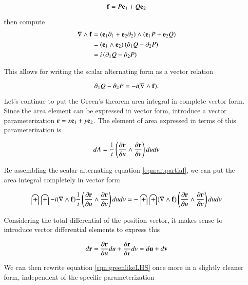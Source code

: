 \documentclass{article}
\newcommand{\grad}[0]{\nabla}
\newcommand{\PD}[2]{\frac{\partial {#2}}{\partial {#1}}}
\begin{document}
\begin{equation*}
\mathbf{f} = P \mathbf{e}_1 + Q \mathbf{e}_2
\end{equation*}

then compute
\begin{align*}
\grad \wedge \Bf
&= \left( \Be_1 \partial_1 + \Be_2 \partial_2 \right) \wedge \left( \Be_1 P + \Be_2 Q \right) \\
&= (\Be_{1} \wedge \Be_2) \left( \partial_1 Q - \partial_2 P \right) \\
&= i \left( \partial_1 Q - \partial_2 P \right) \\
\end{align*}

This allows for writing the scalar alternating form as a vector relation

\begin{equation}\label{eqn:altpartial}
\partial_1 Q - \partial_2 P = - i(\grad \wedge \Bf).
\end{equation}

Let's continue to put the Green's theorem area integral in complete vector form.
Since the area element can be expressed in vector form, introduce a vector parameterization $\mathbf{r} = x \mathbf{e}_1 + y \mathbf{e}_2$.  The element
of area expressed in terms of this parameterization is

\begin{equation*}
dA = \inv{i}\left( \PD{u}{\Br} \wedge \PD{v}{\Br} \right) du dv
\end{equation*}

Re-assembling the scalar alternating equation \ref{eqn:altpartial}, we can put the area integral
completely in vector form

\begin{equation}\label{eqn:greenlikeLHS}
\int\int - i(\grad \wedge \Bf) \inv{i}\left( \PD{u}{\Br} \wedge \PD{v}{\Br} \right) du dv
= -\int\int (\grad \wedge \Bf) \left( \PD{u}{\Br} \wedge \PD{v}{\Br} \right) du dv
\end{equation}

Considering the total differential of the position vector, it makes sense to introduce vector differential elements to
express this

\begin{equation*}
d\Br = \PD{u}{\Br} du + \PD{v}{\Br} dv = d\Bu + d\Bv
\end{equation*}

We can then rewrite equation \ref{eqn:greenlikeLHS}
once more in a slightly cleaner form, independent of the specific parameterization
\end{document}
